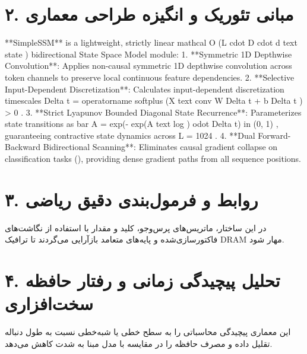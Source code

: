 \documentclass[12pt,a4paper]{article}
\begin{document}
\section*{۲. مبانی تئوریک و انگیزه طراحی معماری}
**SimpleSSM** is a lightweight, strictly linear mathcal O (L cdot D cdot d text state ) bidirectional State Space Model module: 1. **Symmetric 1D Depthwise Convolution**: Applies non-causal symmetric 1D depthwise convolution across token channels to preserve local continuous feature dependencies. 2. **Selective Input-Dependent Discretization**: Calculates input-dependent discretization timescales Delta t = operatorname softplus (X text conv W Delta t + b Delta t ) > 0 . 3. **Strict Lyapunov Bounded Diagonal State Recurrence**: Parameterizes state transitions as bar A = exp(- exp(A text log ) odot Delta t) in (0, 1) , guaranteeing contractive state dynamics across L = 1024 . 4. **Dual Forward-Backward Bidirectional Scanning**: Eliminates causal gradient collapse on classification tasks (), providing dense gradient paths from all sequence positions.

\section*{۳. روابط و فرمول‌بندی دقیق ریاضی}
در این ساختار، ماتریس‌های پرس‌وجو، کلید و مقدار با استفاده از نگاشت‌های فاکتورسازی‌شده و پایه‌های متعامد بازآرایی می‌گردند تا ترافیک DRAM مهار شود.

\section*{۴. تحلیل پیچیدگی زمانی و رفتار حافظه سخت‌افزاری}
این معماری پیچیدگی محاسباتی را به سطح خطی یا شبه‌خطی نسبت به طول دنباله تقلیل داده و مصرف حافظه را در مقایسه با مدل مبنا به شدت کاهش می‌دهد.
\end{document}
